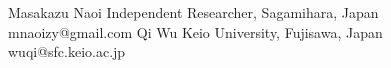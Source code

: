 \twoauthors
  {Masakazu Naoi}
  {Independent Researcher, Sagamihara, Japan\\mnaoizy@gmail.com}
  {Qi Wu}
  {Keio University, Fujisawa, Japan\\wuqi@sfc.keio.ac.jp}
